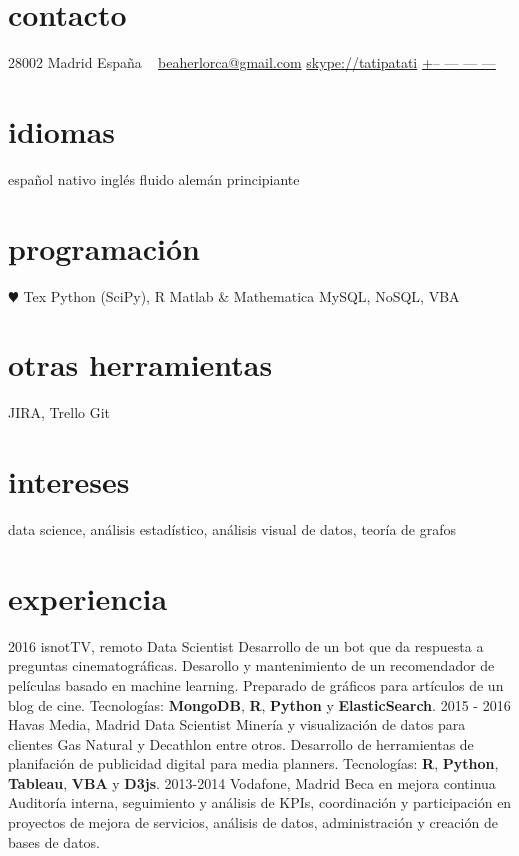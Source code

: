 \documentclass[]{friggeri-cv}
\begin{document}
\begin{aside}
  \section{contacto}
    28002 Madrid
    España
    ~
    \href{mailto:beaherlorca@gmail.com}{beaherlorca@gmail.com}
    \href{skype:<tatipatati>[add]}{skype://tatipatati}
    \href{tel:xxxxxxxxxxx}{+-- --- --- ---}
  \section{idiomas}
    español nativo
    inglés fluido
    alemán principiante
  \section{programación}
    {\color{red} $\varheartsuit$} Tex
    Python (SciPy), R
    Matlab \& Mathematica
    MySQL, NoSQL, VBA
  \section{otras herramientas}
    JIRA, Trello
    Git
\end{aside}

\section{intereses}

data science, análisis estadístico, análisis visual de datos, teoría de grafos

\section{experiencia}

\begin{entrylist}
  \entry
    {2016}
    {isnotTV, remoto}
    {Data Scientist}
    {Desarrollo de un bot que da respuesta a preguntas cinematográficas. Desarollo y mantenimiento de un recomendador de películas basado en machine learning. Preparado de gráficos para artículos de un blog de cine. Tecnologías: \textbf{MongoDB}, \textbf{R}, \textbf{Python} y \textbf{ElasticSearch}.}
  \entry
    {2015 - 2016}
    {Havas Media, Madrid}
    {Data Scientist}
    {Minería y visualización de datos para clientes Gas Natural y Decathlon entre otros. Desarrollo de herramientas de planifación de publicidad digital para media planners. Tecnologías: \textbf{R}, \textbf{Python}, \textbf{Tableau}, \textbf{VBA} y \textbf{D3js}.}
  \entry
    {2013-2014}
    {Vodafone, Madrid}
    {Beca en mejora continua}
    {Auditoría interna, seguimiento y análisis de KPIs, coordinación y participación en proyectos de mejora de servicios, análisis de datos, administración y creación de bases de datos.}
\end{entrylist}
\end{document}
